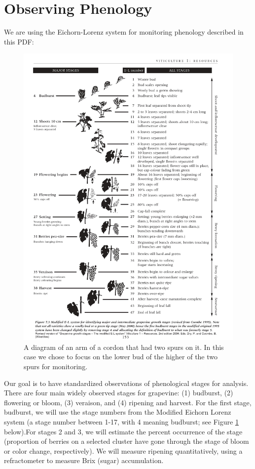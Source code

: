 \documentclass[11pt,letter]{article}
\begin{document}
\section{Observing Phenology}
We are using the Eichorn-Lorenz system for monitoring phenology described in this PDF: \\

\begin{figure}%
  \includegraphics[width=\linewidth]{ELScale.jpg}
  \caption{A diagram of an arm of a cordon that had two spurs on it. In this case we chose to focus on the lower bud of the higher of the two spurs for monitoring. }
  \label{fig:ELScale}
\end{figure}

Our goal is to have standardized observations of phenological stages for analysis. There are four main widely observed stages for grapevine: (1) budburst, (2) flowering or bloom, (3) veraison, and (4) ripening and harvest. For the first stage, budburst, we will use the stage numbers from the Modified Eichorn Lorenz system (a stage number between 1-17, with 4 meaning budburst; see Figure \ref{fig:ELScale} below).For stages 2 and 3, we will estimate the percent occurrence of the stage (proportion of berries on a selected cluster have gone through the stage of bloom or color change, respectively). We will measure ripening quantitatively, using a refractometer to measure Brix (sugar) accumulation. 
\end{document}
